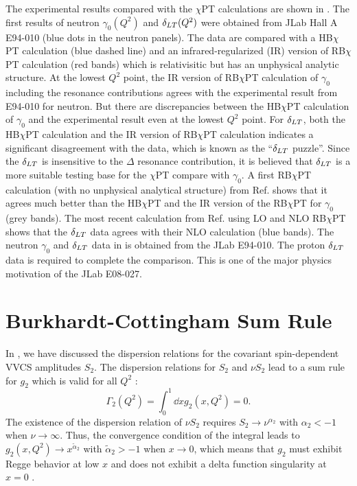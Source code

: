 The experimental results compared with the $\chi$PT calculations are shown in . The first results of neutron $\gamma_0(Q^2)$ and $\delta_{LT}(Q^2)$ were obtained from JLab Hall A E94-010 \cite{Amarian2004b} (blue dots in the neutron panels). The data are compared with a HB$\chi$PT calculation \cite{Kao2003} (blue dashed line) and an infrared-regularized (IR) version of RB$\chi$PT calculation \cite{Bernard2003} (red bands) which is relativisitic but has an unphysical analytic structure. At the lowest $Q^2$ point, the IR version of RB$\chi$PT calculation of $\gamma_0$ including the resonance contributions agrees with the experimental result from E94-010 for neutron. But there are discrepancies between the HB$\chi$PT calculation of $\gamma_0$ and the experimental result even at the lowest $Q^2$ point. For $\delta_{LT}$, both the HB$\chi$PT calculation and the IR version of RB$\chi$PT calculation indicates a significant disagreement with the data, which is known as the ``$\delta_{LT}$ puzzle''. Since the $\delta_{LT}$ is insensitive to the $\Delta$ resonance contribution, it is believed that $\delta_{LT}$ is a more suitable testing base for the $\chi$PT compare with $\gamma_0$. A first RB$\chi$PT calculation (with no unphysical analytical structure) from Ref. \cite{Bernard2013} shows that it agrees much better than the HB$\chi$PT and the IR version of the RB$\chi$PT for $\gamma_0$ (grey bands). The most recent calculation from Ref. \cite{Lensky2014} using LO and NLO RB$\chi$PT shows that the $\delta_{LT}$ data agrees with their NLO calculation (blue bands). The neutron $\gamma_0$ and $\delta_{LT}$ data in  is obtained from the JLab E94-010. The proton $\delta_{LT}$ data is required to complete the comparison. This is one of the major physics motivation of the JLab E08-027.

\section{Burkhardt-Cottingham Sum Rule}
\label{C4S3}

In , we have discussed the dispersion relations for the covariant spin-dependent VVCS amplitudes $S_2$. The dispersion relations for $S_2$ and $\nu S_2$ lead to a sum rule for $g_2$ which is valid for all $Q^2$ \cite{Burkhardt1970}:
\begin{equation} \label{C4S3E1}
\Gamma_2(Q^2) = \int_0^1\dd{x}g_2(x,Q^2) = 0.
\end{equation}
The existence of the dispersion relation of $\nu S_2$ requires $S_2\rightarrow\nu^{\alpha_2}$ with $\alpha_2<-1$ when $\nu\rightarrow\infty$. Thus, the convergence condition of the integral leads to $g_2(x,Q^2)\rightarrow x^{\tilde{\alpha}_2}$ with $\tilde{\alpha}_2>-1$ when $x\rightarrow0$, which means that $g_2$ must exhibit Regge behavior at low $x$ and does not exhibit a delta function singularity at $x=0$ \cite{Jaffe1991}.

